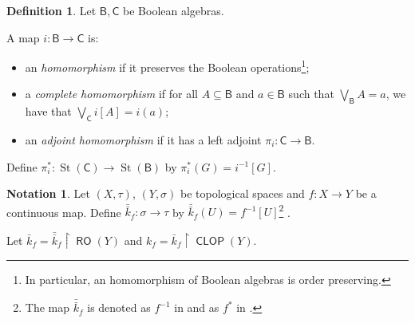 \documentclass[11pt]{amsart}
\theoremstyle{plain}
\newtheorem{fact}[theorem]{Fact}
\theoremstyle{definition}
\newtheorem{definition}[theorem]{Definition}
\newtheorem{notation}[theorem]{Notation}
\theoremstyle{plain}
\theoremstyle{remark}
\DeclareMathOperator{\St}{St}
\DeclareMathOperator{\RO}{\mathsf{RO}}
\DeclareMathOperator{\CLOP}{\mathsf{CLOP}}
\newcommand{\bool}[1]{\mathsf{#1}}
\newcommand{\bp}[1]{\left\lbrace #1 \right\rbrace}
\newcommand{\0}{\mathsf{0}}
\renewcommand{\1}{\mathsf{1}}
\renewcommand{\2}{\mathsf{2}}
\theoremstyle{definition}
\begin{document}
%
%

\begin{definition}\label{def:adjhom}
Let $\bool{B},\bool{C}$ be Boolean algebras.

A map $i:\mathsf{B}\to\mathsf{C}$ is:
\begin{itemize}
\item 
an \emph{homomorphism} if it preserves the Boolean 
operations\footnote{In particular, an homomorphism of Boolean algebras is order preserving.};

\item
a \emph{complete homomorphism} if for all $A\subseteq\bool{B}$ and $a\in \bool{B}$ such that $\bigvee_{\bool{B}}A=a$, we have that $\bigvee_{\bool{C}}i[A]=i(a)$;

\item an
\emph{adjoint homomorphism} if it has a left adjoint $\pi_i:\bool{C}\to\bool{B}$.
\end{itemize}
Define $\pi^*_i:\St(\bool{C})\to\St(\bool{B})$ by $\pi^*_i(G)=i^{-1}[G]$.
\end{definition}

\begin{notation}\label{not:kfpii}
Let $(X,\tau)$, $(Y,\sigma)$ be topological spaces and $f:X\to Y$ be a continuous map.
Define
$\bar{\bar{k}}_f:\sigma\to\tau$ by $\bar{\bar{k}}_f(U)=f^{-1}[U]$\footnote{The map $\bar{\bar{k}}_f$ is denoted as $f^{-1}$ in \cite[Section IX.1]{MacLMoer} and as $f^*$ in \cite[Section II.1]{JohnStone}.} .

Let $\bar{k}_f=\bar{\bar{k}}_f\restriction \RO(Y)$ and $k_f=\bar{k}_f\restriction\CLOP(Y)$.
\end{notation}
\end{document}
